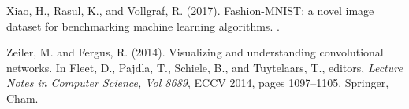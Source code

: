 \documentclass[11pt,oneside,reqno]{amsart}
\begin{document}
\begin{thebibliography}{}
Xiao, H., Rasul, K., and Vollgraf, R. (2017).
\newblock Fashion-{MNIST}: a novel image dataset for benchmarking machine
  learning algorithms.
.

Zeiler, M. and Fergus, R. (2014).
\newblock Visualizing and understanding convolutional networks.
\newblock In Fleet, D., Pajdla, T., Schiele, B., and Tuytelaars, T., editors,
  {\em Lecture Notes in Computer Science, Vol 8689}, ECCV 2014, pages
  1097--1105. Springer, Cham.

\end{thebibliography}




 
\end{document}
